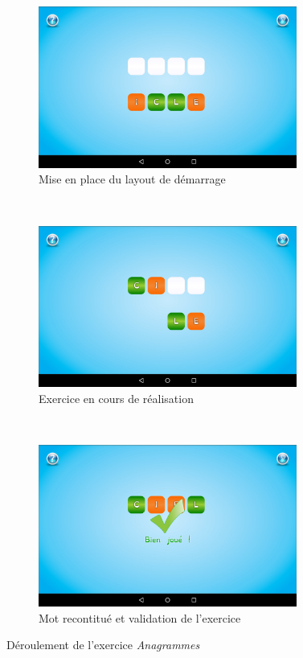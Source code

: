 \begin{figure}[H]
\begin{subfigure}[t]{8.5cm}
\includegraphics[width=8.5cm]{img/ana-debut.png}
\caption{Mise en place du layout de démarrage}
\label{ana1}
\end{subfigure}
~
\begin{subfigure}[t]{8.5cm}
\includegraphics[width=8.5cm]{img/ana-cours.png}
\caption{Exercice en cours de réalisation}
\label{ana2}
\end{subfigure}
~
\begin{subfigure}[t]{8.5cm}
\includegraphics[width=8.5cm]{img/ana-ok.png}
\caption{Mot recontitué et validation de l'exercice}
\label{ana3}
\end{subfigure}
\caption{Déroulement de l'exercice \textit{Anagrammes}}
\end{figure}

